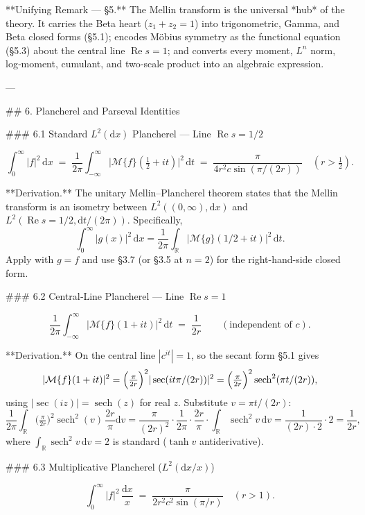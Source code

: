 **Unifying Remark — §5.** The Mellin transform is the universal *hub* of the theory. It carries the Beta heart ($z_{1}+z_{2}=1$) into trigonometric, Gamma, and Beta closed forms (§5.1); encodes Möbius symmetry as the functional equation (§5.3) about the central line $\operatorname{Re} s = 1$; and converts every moment, $L^{n}$ norm, log‑moment, cumulant, and two‑scale product into an algebraic expression.

---

## 6. Plancherel and Parseval Identities

### 6.1 Standard $L^{2}(\mathrm dx)$ Plancherel — Line $\operatorname{Re} s = 1/2$

$$
\int_{0}^{\infty}|f|^{2}\,\mathrm dx \;=\; \frac{1}{2\pi}\int_{-\infty}^{\infty}\bigl|\mathcal M\{f\}(\tfrac{1}{2}+it)\bigr|^{2}\,\mathrm dt \;=\; \frac{\pi}{4r^{2}c\sin(\pi/(2r))}\quad(r>\tfrac{1}{2}).
$$

**Derivation.** The unitary Mellin–Plancherel theorem states that the Mellin transform is an isometry between $L^{2}((0,\infty),\mathrm dx)$ and $L^{2}(\operatorname{Re} s = 1/2,\mathrm dt/(2\pi))$. Specifically,
$$
\int_{0}^{\infty}|g(x)|^{2}\,\mathrm dx = \frac{1}{2\pi}\int_{\mathbb R}|\mathcal M\{g\}(1/2+it)|^{2}\,\mathrm dt.
$$
Apply with $g = f$ and use §3.7 (or §3.5 at $n=2$) for the right-hand-side closed form.

### 6.2 Central‑Line Plancherel — Line $\operatorname{Re} s = 1$

$$
\frac{1}{2\pi}\int_{-\infty}^{\infty}\bigl|\mathcal M\{f\}(1+it)\bigr|^{2}\,\mathrm dt \;=\; \frac{1}{2r}\qquad(\text{independent of }c).
$$

**Derivation.** On the central line $|c^{it}|=1$, so the secant form §5.1 gives
$$
|\mathcal M\{f\}(1+it)|^{2} = \Bigl(\tfrac{\pi}{2r}\Bigr)^{2}|\sec(it\pi/(2r))|^{2} = \Bigl(\tfrac{\pi}{2r}\Bigr)^{2}\operatorname{sech}^{2}(\pi t/(2r)),
$$
using $|\sec(iz)| = \operatorname{sech}(z)$ for real $z$. Substitute $v = \pi t/(2r)$:
$$
\frac{1}{2\pi}\int_{\mathbb R}\bigl(\tfrac{\pi}{2r}\bigr)^{2}\operatorname{sech}^{2}(v)\,\frac{2r}{\pi}\mathrm dv = \frac{\pi}{(2r)^{2}}\cdot\frac{1}{2\pi}\cdot\frac{2r}{\pi}\cdot\int_{\mathbb R}\operatorname{sech}^{2}v\,\mathrm dv = \frac{1}{(2r)\cdot 2}\cdot 2 = \frac{1}{2r},
$$
where $\int_{\mathbb R}\operatorname{sech}^{2}v\,\mathrm dv = 2$ is standard ($\tanh v$ antiderivative).

### 6.3 Multiplicative Plancherel ($L^{2}(\mathrm dx/x)$)

$$
\int_{0}^{\infty}|f|^{2}\,\frac{\mathrm dx}{x} \;=\; \frac{\pi}{2r^{2}c^{2}\sin(\pi/r)}\quad(r>1).
$$

